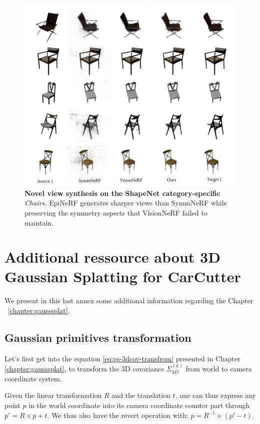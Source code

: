 \begin{figure}[htp!]
    \begin{center}
  \includegraphics[width=\linewidth]{images/epinerf/supp_Chairs_additional_inference.png}
  \caption{\textbf{Novel view synthesis on the ShapeNet category-specific} \textit{Chairs. }EpiNeRF generates sharper views than SymmNeRF while preserving the symmetry aspects that VisionNeRF failed to maintain.}
  \label{fig:supp_chairs}
  \end{center}
\end{figure}

\chapter{Additional ressource about 3D Gaussian Splatting for CarCutter}

We present in this last annex some additional information regarding the Chapter ~\ref{chapter:gausssplat}. 

\section{Gaussian primitives transformation}
\label{appendix:cov}
Let's first get into the equation \ref{eq:gs-3dcov-transfrom} presented in Chapter \ref{chapter:gausssplat}, to transform the 3D covariance $\Sigma^{(k)}_{3D}$ from world to camera coordinate system.

Given the linear transformation $R$ and the translation $t$, one can thus express any point $p$ in the world coordinate into its camera coordinate counter part through $p' = R\times p + t$. We thus also have the revert operation with: $p = R^{-1}\times (p' - t)$. 

